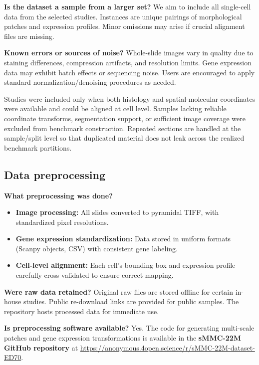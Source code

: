 \documentclass[sigconf,review]{acmart}
\newcommand{\dataset}{sMMC-22M\xspace}
\newcommand{\datasheetq}[1]{\par\noindent\textbf{#1}\enspace}
\begin{document}
\datasheetq{Is the dataset a sample from a larger set?}
We aim to include all single-cell data from the selected studies. Instances are unique pairings of morphological patches and expression profiles. Minor omissions may arise if crucial alignment files are missing.

\datasheetq{Known errors or sources of noise?}
Whole-slide images vary in quality due to staining differences, compression artifacts, and resolution limits. Gene expression data may exhibit batch effects or sequencing noise. Users are encouraged to apply standard normalization/denoising procedures as needed.

Studies were included only when both histology and spatial-molecular coordinates were available and could be aligned at cell level. Samples lacking reliable coordinate transforms, segmentation support, or sufficient image coverage were excluded from benchmark construction. Repeated sections are handled at the sample/split level so that duplicated material does not leak across the realized benchmark partitions.


\subsection{Data preprocessing}
\datasheetq{What preprocessing was done?}
\begin{itemize}
    \item \textbf{Image processing:} All slides converted to pyramidal TIFF, with standardized pixel resolutions.
    \item \textbf{Gene expression standardization:} Data stored in uniform formats (Scanpy objects, CSV) with consistent gene labeling.
    \item \textbf{Cell-level alignment:} Each cell’s bounding box and expression profile carefully cross-validated to ensure correct mapping.
\end{itemize}

\datasheetq{Were raw data retained?}
Original raw files are stored offline for certain in-house studies. Public re-download links are provided for public samples. The repository hosts processed data for immediate use.

\datasheetq{Is preprocessing software available?}
Yes. The code for generating multi-scale patches and gene expression transformations is available in the \textbf{\dataset GitHub repository} at \url{https://anonymous.4open.science/r/sMMC-22M-dataset-ED70}.
\end{document}
